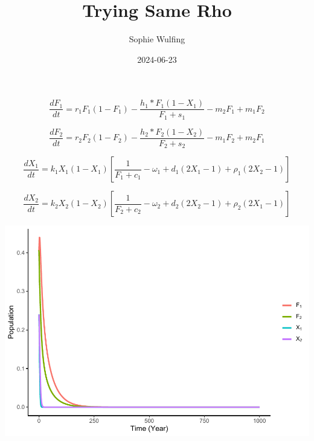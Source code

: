\documentclass[
]{article}
\title{Trying Same Rho}
\author{Sophie Wulfing}
\date{2024-06-23}
\begin{document}
\maketitle

\begin{equation}
\frac{dF_1}{dt} = r_1F_1(1-F_1)-\frac{h_1*F_1(1-X_1)}{F_1 + s_1} -m_2F_1 + m_1F_2
  \label{eq:FishWhole1}
\end{equation}

\begin{equation}
\frac{dF_2}{dt} = r_2F_2(1-F_2)-\frac{h_2*F_2(1-X_2)}{F_2 + s_2} -m_1F_2 + m_2F_1
  \label{eq:FishWhole2}
\end{equation}

\begin{equation}
\frac{dX_1}{dt} =  k_1X_1(1-X_1) [\frac{1}{F_1+c_1} - \omega_1 + d_1(2X_1 - 1) + \rho_1(2X_2 - 1)]
  \label{eq:SocWhole1}
\end{equation}

\begin{equation}
\frac{dX_2}{dt} = k_2X_2(1-X_2)  [\frac{1}{F_2+c_2} - \omega_2 + d_2(2X_2 - 1) +  \rho_2(2X_1 - 1)]
  \label{eq:SocWhole2}
\end{equation}

\includegraphics{BothRhos_files/figure-latex/Bauch.Coupled-1.pdf}
\end{document}
